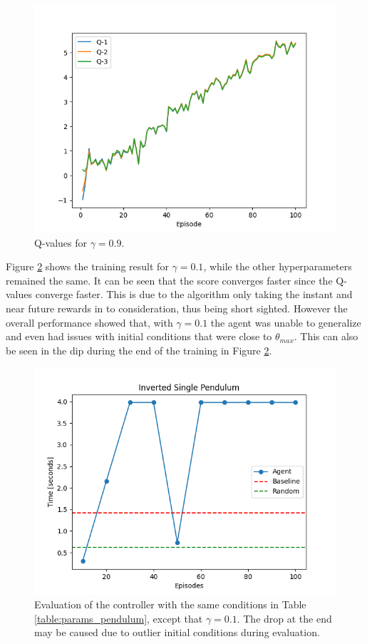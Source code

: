 \documentclass[final]{LTHtwocol} %
\begin{document}
\begin{figure}[htp]
	\centering
	\includegraphics[width=0.9\columnwidth]{figures/Pendulum_q_gamma_09.png}
	\caption{Q-values for $\gamma=0.9$.}
	\label{fig:pendulum_gamma_09}
\end{figure}

Figure \ref{fig:single_pendulum_eval_01} shows the training result for $\gamma=0.1$, while the other hyperparameters remained the same. It can be seen that the score converges faster since the Q-values converge faster. This is due to the algorithm only taking the instant and near future rewards in to consideration, thus being short sighted. However the overall performance showed that, with $\gamma=0.1$ the agent was unable to generalize and even had issues with initial conditions that were close to $\theta_{max}$. This can also be seen in the dip during the end of the training in Figure \ref{fig:single_pendulum_eval_01}.
\begin{figure}[htp]
	\centering
	\includegraphics[width=0.9\columnwidth]{figures/SinglePendulum_gamma_01_evaluation_time.png}
	\caption{Evaluation of the controller with the same conditions in Table \ref{table:params_pendulum}, except that $\gamma=0.1$. The drop at the end may be caused due to outlier initial conditions during evaluation.}
	\label{fig:single_pendulum_eval_01}
\end{figure}
\end{document}
